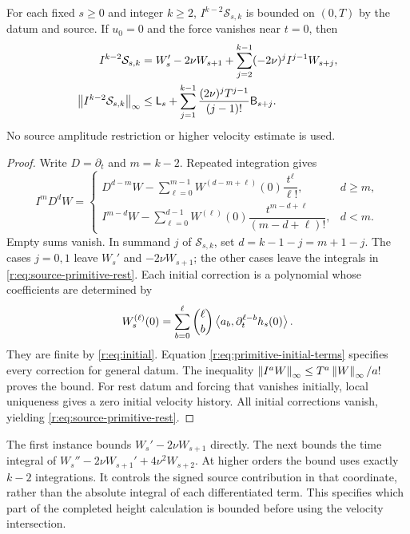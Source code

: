 \begin{proposition}
\label{r:prop:source-primitive}
For each fixed \(s\ge0\) and integer \(k\ge2\),
\(I^{k-2}\mathcal S_{s,k}\) is bounded on \((0,T)\) by the datum and
source. If \(u_0=0\) and the force vanishes near \(t=0\), then
\begin{equation}
 \begin{aligned}
 I^{k-2}\mathcal S_{s,k}
 &=W_s'-2\nu W_{s+1}
 +\sum_{j=2}^{k-1}(-2\nu)^jI^{j-1}W_{s+j},\\
 \left\lVert I^{k-2}\mathcal S_{s,k}\right\rVert_\infty
 &\le\mathsf L_s+
 \sum_{j=1}^{k-1}\frac{(2\nu)^jT^{j-1}}{(j-1)!}\mathsf B_{s+j}.
 \end{aligned}
 \label{r:eq:source-primitive-rest}
\end{equation}
No source amplitude restriction or higher velocity estimate is used.
\end{proposition}

\begin{proof}
Write \(D=\partial_t\) and \(m=k-2\). Repeated integration gives
\begin{equation}
 I^mD^dW=
 \begin{cases}
 D^{d-m}W-\displaystyle\sum_{\ell=0}^{m-1}
 W^{(d-m+\ell)}(0)\dfrac{t^\ell}{\ell!},&d\ge m,\\[5pt]
 I^{m-d}W-\displaystyle\sum_{\ell=0}^{d-1}
 W^{(\ell)}(0)\dfrac{t^{m-d+\ell}}{(m-d+\ell)!},&d<m.
 \end{cases}
 \label{r:eq:primitive-initial-terms}
\end{equation}
Empty sums vanish. In summand \(j\) of \(\mathcal S_{s,k}\), set
\(d=k-1-j=m+1-j\). The cases \(j=0,1\) leave \(W_s'\) and
\(-2\nu W_{s+1}\); the other cases leave the integrals in
\eqref{r:eq:source-primitive-rest}. Each initial correction is a polynomial
whose coefficients are determined by
\[
 W_s^{(\ell)}(0)=\sum_{b=0}^{\ell}\binom\ell b
 \left\langle a_b,\partial_t^{\ell-b}h_s(0)\right\rangle.
\]
They are finite by \eqref{r:eq:initial}. Equation
\eqref{r:eq:primitive-initial-terms} specifies every correction for general
datum. The inequality \(\left\lVert I^aW\right\rVert_\infty\le T^a\left\lVert W\right\rVert_\infty/a!\)
proves the bound. For rest datum and forcing that vanishes initially,
local uniqueness gives a zero initial velocity history. All initial
corrections vanish, yielding \eqref{r:eq:source-primitive-rest}.
\end{proof}

The first instance bounds \(W_s'-2\nu W_{s+1}\) directly. The next
bounds the time integral of
\(W_s''-2\nu W_{s+1}'+4\nu^2W_{s+2}\). At higher orders the bound
uses exactly \(k-2\) integrations. It controls the signed source
contribution in that coordinate, rather than the absolute integral of
each differentiated term. This specifies which part of the completed
height calculation is bounded before using the velocity intersection.

